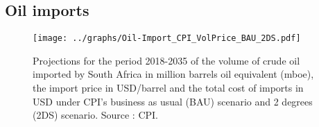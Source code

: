 \documentclass[12pt,english]{article}
\begin{document}
%
%
%
%
%
%
%


\subsection{Oil imports}

\begin{figure}[!t]
	\centering
	\texttt{[image: ../graphs/Oil-Import\_CPI\_VolPrice\_BAU\_2DS.pdf]}
	\caption{\label{Coal-Export_CPI_VolPrice_BAU_2DS}\small Projections for the period 2018-2035 of the volume of crude oil imported by South Africa in million barrels oil equivalent (mboe), the import price in USD/barrel and the total cost of imports in USD under CPI's business as usual (BAU) scenario and 2 degrees (2DS) scenario. Source : CPI.}
\end{figure}
\end{document}
